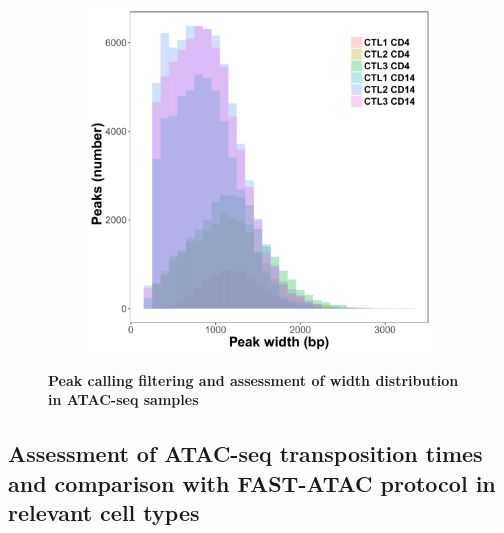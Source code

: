 \begin{figure}[htbp]
\begin{subfigure}{0.5\textwidth}
\includegraphics[width=\textwidth]{./Results1/pdfs/peak_width_hist_CD4_CD14_PVAL_IDR_filtered_peaks}
\caption{\textbf{}} %
\end{subfigure}%
\caption[Peak calling assessment and IDR filtering in ATAC-seq samples]{\textbf{Peak calling filtering and assessment of width distribution in ATAC-seq samples} \\
}
\label{fig:Peak_calling_IDR_filtering_and_width_ATAC}
\end{figure} 



\subsection{Assessment of ATAC-seq transposition times and comparison with FAST-ATAC protocol in relevant cell types}



